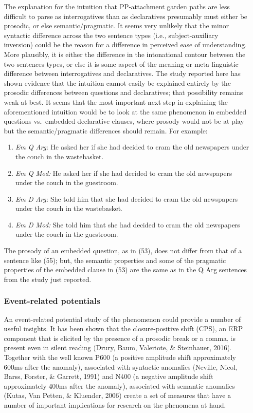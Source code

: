 \documentclass[11pt,oneside]{book}
\begin{document}
The explanation for the intuition that PP-attachment garden paths are less difficult to parse as interrogatives than as declaratives presumably must either be prosodic, or else semantic/pragmatic. It seems very unlikely that the minor syntactic difference across the two sentence types (i.e., subject-auxiliary inversion) could be the reason for a difference in perceived ease of understanding. More plausibly, it is either the difference in the intonational contour between the two sentences types, or else it is some aspect of the meaning or meta-linguistic difference between interrogatives and declaratives. The study reported here has shown evidence that the intuition cannot easily be explained entirely by the prosodic differences between questions and declaratives; that possibility remains weak at best. It seems that the most important next step in explaining the aforementioned intuition would be to look at the same phenomenon in embedded questions vs.~embedded declarative clauses, where prosody would not be at play but the semantic/pragmatic differences should remain. For example:

\begin{enumerate}
\def\labelenumi{(\arabic{enumi})}
\setcounter{enumi}{52}
\item
  \emph{Em Q Arg:} He asked her if she had decided to cram the old newspapers under the couch in the wastebasket.
\item
  \emph{Em Q Mod:} He asked her if she had decided to cram the old newspapers under the couch in the guestroom.
\item
  \emph{Em D Arg:} She told him that she had decided to cram the old newspapers under the couch in the wastebasket.
\item
  \emph{Em D Mod:} She told him that she had decided to cram the old newspapers under the couch in the guestroom.
\end{enumerate}

The prosody of an embedded question, as in (53), does not differ from that of a sentence like (55); but, the semantic properties and some of the pragmatic properties of the embedded clause in (53) are the same as in the Q Arg sentences from the study just reported.

\hypertarget{erp}{%
\subsubsection{Event-related potentials}\label{erp}}

An event-related potential study of the phenomenon could provide a number of useful insights. It has been shown that the closure-positive shift (CPS), an ERP component that is elicited by the presence of a prosodic break or a comma, is present even in silent reading (Drury, Baum, Valeriote, \& Steinhauer, 2016). Together with the well known P600 (a positive amplitude shift approximately 600ms after the anomaly), associated with syntactic anomalies (Neville, Nicol, Barss, Forster, \& Garrett, 1991) and N400 (a negative amplitude shift approximately 400ms after the anomaly), associated with semantic anomalies (Kutas, Van Petten, \& Kluender, 2006) create a set of measures that have a number of important implications for research on the phenomena at hand.
\end{document}
